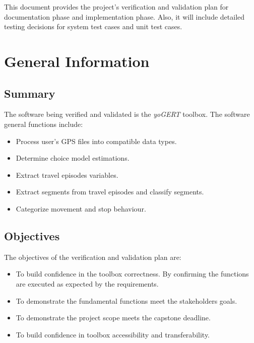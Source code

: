 \documentclass[12pt, titlepage]{article}
\begin{document}
This document provides the project's verification and 
validation plan for documentation phase and implementation phase. Also, it will include detailed testing decisions for system test cases and unit test cases.  

\section{General Information}

\subsection{Summary}
The software being verified and validated is the \emph{yoGERT} toolbox. The software general functions include:
\begin{itemize}
    \item Process user's GPS files into compatible data types.
    \item Determine choice model estimations.
    \item Extract travel episodes variables.
    \item Extract segments from travel episodes and classify segments.
    \item Categorize movement and stop behaviour. 
\end{itemize}


\subsection{Objectives}
The objectives of the verification and validation plan are:
\begin{itemize}
    \item To build confidence in the toolbox correctness. By confirming the functions are executed as expected by the requirements. 
    \item To demonstrate the fundamental functions meet the stakeholders goals.
    \item To demonstrate the project scope meets the capstone deadline. 
    \item To build confidence in toolbox accessibility and transferability. 
\end{itemize}

\end{document}
